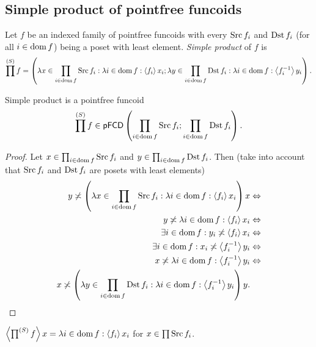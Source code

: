 \subsection{Simple product of pointfree funcoids}
\begin{defn}
Let $f$ be an indexed family of pointfree
funcoids with every $\operatorname{Src} f_{i}$ and $\operatorname{Dst} f_{i}$ (for all $i\in\operatorname{dom} f$)
being a poset with least element. \emph{Simple product} of $f$ is
\[
\prod^{(S)}f=\left(\lambda x\in\prod_{i\in\operatorname{dom} f}\operatorname{Src} f_{i}:\lambda i\in\operatorname{dom} f:\left\langle f_{i}\right\rangle x_{i};\lambda y\in\prod_{i\in\operatorname{dom} f}\operatorname{Dst} f_{i}:\lambda i\in\operatorname{dom} f:\left\langle f_{i}^{-1}\right\rangle y_{i}\right).
\]
\end{defn}
\begin{prop}
Simple product is a pointfree funcoid 
\[
\prod^{(S)}f\in\mathsf{pFCD}\left(\prod_{i\in\operatorname{dom} f}\operatorname{Src} f_{i};\prod_{i\in\operatorname{dom} f}\operatorname{Dst} f_{i}\right).
\]
\end{prop}
\begin{proof}
Let $x\in\prod_{i\in\operatorname{dom} f}\operatorname{Src} f_{i}$ and $y\in\prod_{i\in\operatorname{dom} f}\operatorname{Dst} f_{i}$.
Then (take into account that $\operatorname{Src} f_{i}$ and $\operatorname{Dst} f_{i}$ are posets
with least elements)
\begin{align*}
y\not\asymp\left(\lambda x\in\prod_{i\in\operatorname{dom} f}\operatorname{Src} f_{i}:\lambda i\in\operatorname{dom} f:\left\langle f_{i}\right\rangle x_{i}\right)x & \Leftrightarrow\\
y\not\asymp\lambda i\in\operatorname{dom} f:\left\langle f_{i}\right\rangle x_{i} & \Leftrightarrow\\
\exists i\in\operatorname{dom} f:y_{i}\not\asymp\left\langle f_{i}\right\rangle x_{i} & \Leftrightarrow\\
\exists i\in\operatorname{dom} f:x_{i}\not\asymp\left\langle f_{i}^{-1}\right\rangle y_{i} & \Leftrightarrow\\
x\not\asymp\lambda i\in\operatorname{dom} f:\left\langle f_{i}^{-1}\right\rangle y_{i} & \Leftrightarrow\\
x\not\asymp\left(\lambda y\in\prod_{i\in\operatorname{dom} f}\operatorname{Dst} f_{i}:\lambda i\in\operatorname{dom} f:\left\langle f_{i}^{-1}\right\rangle y_{i}\right)y.
\end{align*}
\end{proof}
\begin{obvious}
$\left\langle \prod^{(S)}f\right\rangle x=\lambda i\in\operatorname{dom} f:\left\langle f_{i}\right\rangle x_{i}$
for $x\in\prod\operatorname{Src} f_{i}$.
\end{obvious}


